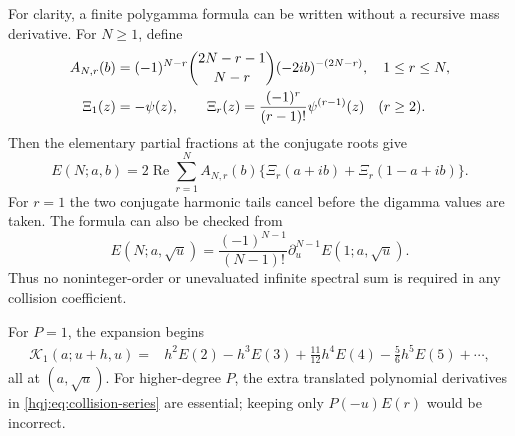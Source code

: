 \documentclass[11pt,letterpaper]{article}
\numberwithin{equation}{section}
\theoremstyle{definition}
\newcommand{\Rea}{\operatorname{Re}}
\begin{document}
For clarity, a finite polygamma formula can be written without a
recursive mass derivative. For $N\ge1$, define
\begin{align}
A_{N,r}(b)&=(-1)^{N-r}\binom{2N-r-1}{N-r}(-2ib)^{-(2N-r)},
\quad 1\le r\le N,\notag\\
\Xi_1(z)&=-\psi(z),\qquad
\Xi_r(z)=\frac{(-1)^r}{(r-1)!}\psi^{(r-1)}(z)\quad(r\ge2).
\end{align}
Then the elementary partial fractions at the conjugate roots give
\begin{equation}\label{hqj:eq:finite-polygamma}
E(N;a,b)=2\Rea\sum_{r=1}^N A_{N,r}(b)
\bigl\{\Xi_r(a+ib)+\Xi_r(1-a+ib)\bigr\}.
\end{equation}
For $r=1$ the two conjugate harmonic tails cancel before the digamma
values are taken. The formula can also be checked from
\begin{equation}\label{hqj:eq:resolvent-derivative}
E(N;a,\sqrt u)=\frac{(-1)^{N-1}}{(N-1)!}
\partial_u^{N-1}E(1;a,\sqrt u).
\end{equation}
Thus no noninteger-order or unevaluated infinite spectral sum is
required in any collision coefficient.

For $P=1$, the expansion begins
\begin{align}
\mathcal K_1(a;u+h,u)
={}&h^2E(2)-h^3E(3)+\tfrac{11}{12}h^4E(4)
-\tfrac56h^5E(5)+\cdots,
\label{hqj:eq:collision-low}
\end{align}
all at $(a,\sqrt u)$. For higher-degree $P$, the extra translated
polynomial derivatives in \eqref{hqj:eq:collision-series} are essential;
keeping only $P(-u)E(r)$ would be incorrect.
\end{document}
